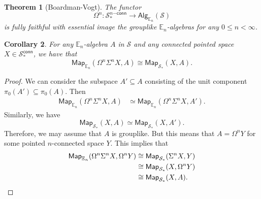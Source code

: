 \documentclass[10pt, oneside]{memoir}
\newtheorem{thm}{Theorem}[subsection]
\newtheorem{cor}[thm]{Corollary}
\theoremstyle{definition}
\theoremstyle{remark}
\theoremstyle{plain}
\theoremstyle{definition}
\theoremstyle{remark}
\newcommand{\E}{\mathbb{E}}
\newcommand{\mc}[1]{\mathcal{#1}}
\newcommand{\ms}[1]{\mathsf{#1}}
\newcommand{\1}{\mathbf{1}}
\newcommand{\2}{\mathbf{2}}
\newcommand{\3}{\mathbf{3}}
\begin{document}
\begin{thm}[Boardman-Vogt]\label{thm:enalgspaces}
    The functor 
    \[ \Omega^n \colon \mc{S}_*^{n\ms{-conn}} \to \ms{Alg}_{\E_n}(\mc{S}) \]
    is fully faithful with essential image the grouplike \(\E_n \)-algebras for any \(0 \leq n < \infty \).
\end{thm}

\begin{cor}
    For any \(\E_n \)-algebra \(A \) in \(\mc{S} \) and any connected pointed space \(X \in \mc{S}_*^{\ms{conn}} \), we have that
    \[ \ms{Map}_{\E_n}(\Omega^n \Sigma^n X, A) \cong \ms{Map}_{\mc{S}_*}(X, A). \]
\end{cor}

\begin{proof}
    We can consider the subspace \(A' \subseteq A \) consisting of the unit component \(\pi_0(A') \subseteq \pi_0(A) \). Then
    \begin{align*}
        \ms{Map}_{\E_n}(\Omega^n \Sigma^n X, A) &\simeq \ms{Map}_{\E_n} (\Omega^n \Sigma^n X, A').
    \end{align*}
    Similarly, we have
    \[ \ms{Map}_{\mc{S}_*}(X, A) \simeq \ms{Map}_{\mc{S}_*}(X, A'). \]
    Therefore, we may assume that \(A \) is grouplike. But this means that \(A = \Omega^n Y \) for some pointed \(n \)-connected space \(Y \). This implies that
    \begin{align*}
        \ms{Map}_{\E_n}(\Omega^n \Sigma^n X, \Omega^n Y) &\cong \ms{Map}_{\mc{S}_*} (\Sigma^n X, Y) \\
        &\cong \ms{Map}_{\mc{S}_*}(X, \Omega^n Y) \\
        &\cong \ms{Map}_{\mc{S}_*}(X, A). \qedhere
    \end{align*}
\end{proof}
\end{document}
